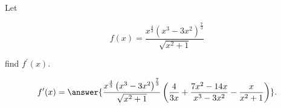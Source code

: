 \documentclass{ximera}
\begin{document}
\begin{exercise}
\label{exercise:6-15}
Let

\[
f(x)=\frac{x^{\frac{4}{3}}\left(x^{3}-3 x^{2}\right)^{\frac{7}{3}}}{\sqrt{x^{2}+1}}
\]

find $f^{\prime}(x)$.

\[
f^{\prime}(x)=\answer{\frac{x^{\frac{4}{3}}\left(x^{3}-3 x^{2}\right)^{\frac{7}{3}}}{\sqrt{x^{2}+1}}\left(\frac{4}{3x}+\frac{7x^{2}-14x}{x^{3}-3x^{2}}-\frac{x}{x^{2}+1}\right)}.
\]
\end{exercise}
\end{document}
